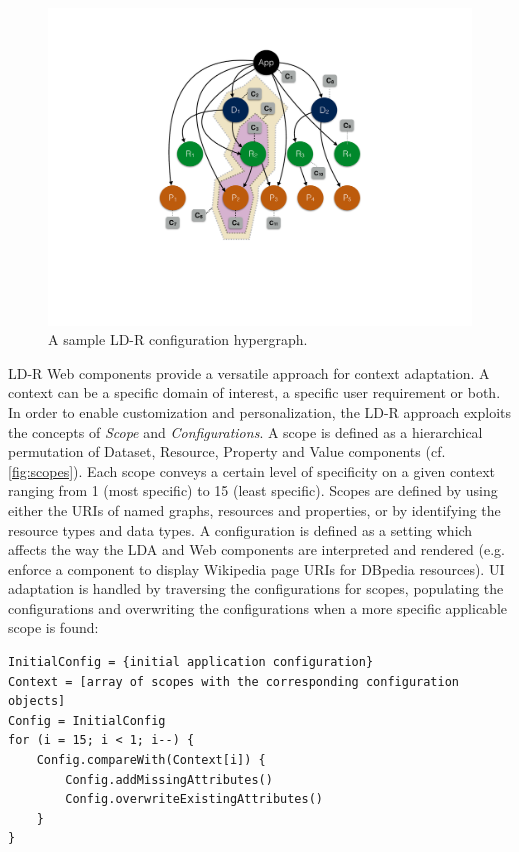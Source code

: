 \documentclass{acm_proc_article-sp}
\begin{document}
\begin{figure}[tb]
 \center
  \includegraphics[width=.73\linewidth]{images/exampleConfig.pdf}
  \caption{A sample LD-R configuration hypergraph.}
  \label{fig:exampleConfig}
\end{figure}

LD-R Web components provide a versatile approach for context adaptation.
A context can be a specific domain of interest, a specific user requirement or both.
In order to enable customization and personalization, the LD-R approach exploits the concepts of \emph{Scope} and \emph{Configurations}.
A scope is defined as a hierarchical permutation of Dataset, Resource, Property and Value components (cf. \autoref{fig:scopes}).
Each scope conveys a certain level of specificity on a given context ranging from 1 (most specific) to 15 (least specific).
Scopes are defined by using either the URIs of named graphs, resources and properties, or by identifying the resource types and data types.
A configuration is defined as a setting which affects the way the LDA and Web components are interpreted and rendered (e.g. enforce a component to display Wikipedia page URIs for DBpedia resources).
UI adaptation is handled by traversing the configurations for scopes, populating the configurations and overwriting the configurations when a more specific applicable scope is found:

\begin{lstlisting}[firstnumber=1, backgroundcolor=\color{white}, basicstyle=\small\tt, label=code:adaptation, caption=Algorithm for the LD-R UI adaptation.]
InitialConfig = {initial application configuration}
Context = [array of scopes with the corresponding configuration objects]
Config = InitialConfig
for (i = 15; i < 1; i--) {
    Config.compareWith(Context[i]) {
        Config.addMissingAttributes()
        Config.overwriteExistingAttributes()
    }
}
\end{lstlisting}
\end{document}

